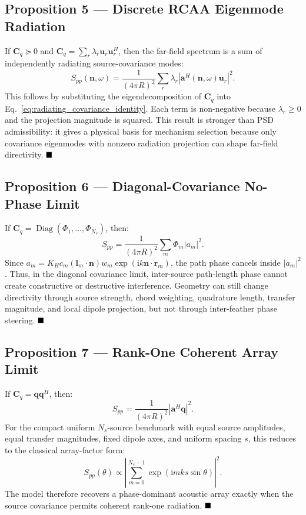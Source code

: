 \documentclass[11pt]{article}
\newcommand{\ii}{\mathrm{i}}
\newcommand{\vect}[1]{\bm{#1}}
\newcommand{\mat}[1]{\bm{#1}}
\begin{document}
\subsection{Proposition 5 --- Discrete RCAA Eigenmode Radiation}

If $\mat{C}_q\succeq0$ and $\mat{C}_q=\sum_r\lambda_r\vect{u}_r\vect{u}_r^H$, then the far-field spectrum is a sum of independently radiating source-covariance modes:
\begin{equation*}
    S_{pp}(\vect{n},\omega)
    =
    \frac{1}{(4\pi R)^2}
    \sum_r
    \lambda_r
    \left|
        \vect{a}^H(\vect{n},\omega)\vect{u}_r
    \right|^2.
\end{equation*}
This follows by substituting the eigendecomposition of $\mat{C}_q$ into Eq.~\ref{eq:radiating_covariance_identity}. Each term is non-negative because $\lambda_r\ge0$ and the projection magnitude is squared. This result is stronger than PSD admissibility: it gives a physical basis for mechanism selection because only covariance eigenmodes with nonzero radiation projection can shape far-field directivity. $\hfill \blacksquare$

\subsection{Proposition 6 --- Diagonal-Covariance No-Phase Limit}

If $\mat{C}_q=\operatorname{Diag}(\Phi_1,\ldots,\Phi_{N_s})$, then:
\begin{equation*}
    S_{pp}
    =
    \frac{1}{(4\pi R)^2}
    \sum_m
    \Phi_m |a_m|^2.
\end{equation*}
Since $a_m=K_Hc_m(\vect{l}_m\cdot\vect{n})w_m\exp(\ii k\vect{n}\cdot\vect{r}_m)$, the path phase cancels inside $|a_m|^2$. Thus, in the diagonal covariance limit, inter-source path-length phase cannot create constructive or destructive interference. Geometry can still change directivity through source strength, chord weighting, quadrature length, transfer magnitude, and local dipole projection, but not through inter-feather phase steering. $\hfill \blacksquare$

\subsection{Proposition 7 --- Rank-One Coherent Array Limit}

If $\mat{C}_q=\vect{q}\vect{q}^{H}$, then:
\begin{equation*}
    S_{pp}
    =
    \frac{1}{(4\pi R)^2}
    \left|
        \vect{a}^{H}\vect{q}
    \right|^2.
\end{equation*}
For the compact uniform $N_s$-source benchmark with equal source amplitudes, equal transfer magnitudes, fixed dipole axes, and uniform spacing $s$, this reduces to the classical array-factor form:
\begin{equation*}
    S_{pp}(\theta)
    \propto
    \left|
        \sum_{m=0}^{N_s-1}
        \exp\left(\ii mks\sin\theta\right)
    \right|^2.
\end{equation*}
The model therefore recovers a phase-dominant acoustic array exactly when the source covariance permits coherent rank-one radiation. $\hfill \blacksquare$
\end{document}
